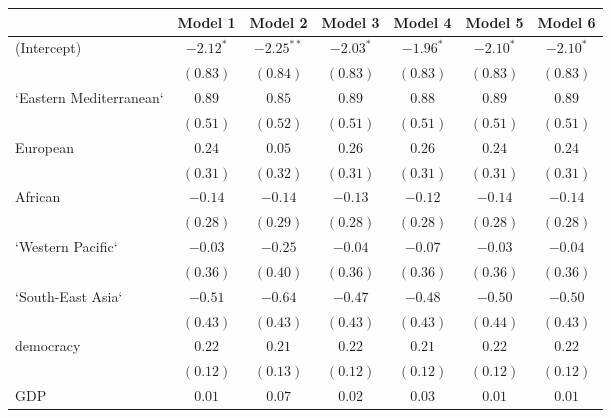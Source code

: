 
\begin{table}[!h]
\begin{center}
\begin{tabular}{l c c c c c c }
\toprule
 & Model 1 & Model 2 & Model 3 & Model 4 & Model 5 & Model 6 \\
\midrule
(Intercept)             & $-2.12^{*}$  & $-2.25^{**}$ & $-2.03^{*}$  & $-1.96^{*}$  & $-2.10^{*}$  & $-2.10^{*}$  \\
                        & $(0.83)$     & $(0.84)$     & $(0.83)$     & $(0.83)$     & $(0.83)$     & $(0.83)$     \\
`Eastern Mediterranean` & $0.89$       & $0.85$       & $0.89$       & $0.88$       & $0.89$       & $0.89$       \\
                        & $(0.51)$     & $(0.52)$     & $(0.51)$     & $(0.51)$     & $(0.51)$     & $(0.51)$     \\
European                & $0.24$       & $0.05$       & $0.26$       & $0.26$       & $0.24$       & $0.24$       \\
                        & $(0.31)$     & $(0.32)$     & $(0.31)$     & $(0.31)$     & $(0.31)$     & $(0.31)$     \\
African                 & $-0.14$      & $-0.14$      & $-0.13$      & $-0.12$      & $-0.14$      & $-0.14$      \\
                        & $(0.28)$     & $(0.29)$     & $(0.28)$     & $(0.28)$     & $(0.28)$     & $(0.28)$     \\
`Western Pacific`       & $-0.03$      & $-0.25$      & $-0.04$      & $-0.07$      & $-0.03$      & $-0.04$      \\
                        & $(0.36)$     & $(0.40)$     & $(0.36)$     & $(0.36)$     & $(0.36)$     & $(0.36)$     \\
`South-East Asia`       & $-0.51$      & $-0.64$      & $-0.47$      & $-0.48$      & $-0.50$      & $-0.50$      \\
                        & $(0.43)$     & $(0.43)$     & $(0.43)$     & $(0.43)$     & $(0.44)$     & $(0.43)$     \\
democracy               & $0.22$       & $0.21$       & $0.22$       & $0.21$       & $0.22$       & $0.22$       \\
                        & $(0.12)$     & $(0.13)$     & $(0.12)$     & $(0.12)$     & $(0.12)$     & $(0.12)$     \\
GDP                     & $0.01$       & $0.07$       & $0.02$       & $0.03$       & $0.01$       & $0.01$       \\

\end{tabular}
\end{center}
\end{table}

